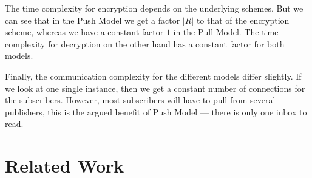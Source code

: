 The time complexity for encryption depends on the underlying schemes.
But we can see that in the Push Model we get a factor \(|R|\) to that of the 
encryption scheme, whereas we have a constant factor \(1\) in the Pull 
Model.
The time complexity for decryption on the other hand has a constant factor for 
both models.

Finally, the communication complexity for the different models differ slightly.
If we look at one single instance, then we get a constant number of connections
for the subscribers.
However, most subscribers will have to pull from several publishers, this is 
the argued benefit of Push Model --- there is only one inbox to read.

%


\section{Related Work}


